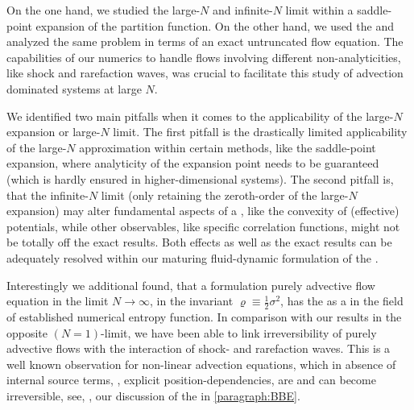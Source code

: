 On the one hand, we studied the large-$N$ and infinite-$N$ limit within a saddle-point expansion of the partition function.
On the other hand, we used the \frg{} and analyzed the same problem in terms of an exact untruncated \frg{} flow equation.
The capabilities of our \kt{} \fv{} numerics to handle \frg{} flows involving different non-analyticities, like shock and rarefaction waves, was crucial to facilitate this study of advection dominated systems at large $N$.
	
We identified two main pitfalls when it comes to the applicability of the large-$N$ expansion or large-$N$ limit.	
The first pitfall is the drastically limited applicability of the large-$N$ approximation within certain methods, like the saddle-point expansion, where analyticity of the expansion point needs to be guaranteed (which is \apriori{} hardly ensured in higher-dimensional systems).
The second pitfall is, that the infinite-$N$ limit (only retaining the zeroth-order of the large-$N$ expansion) may alter fundamental aspects of a \qft{}, like the convexity of (effective) potentials, while other observables, like specific correlation functions, might not be totally off the exact results.
Both effects as well as the exact results can be adequately resolved within our maturing fluid-dynamic formulation of the \frg{}.

Interestingly we additional found, that a formulation purely advective flow equation in the limit $N\rightarrow\infty$, in the invariant $\varrho\equiv\tfrac{1}{2}\sigma^2$, has the \tv{} as a \dash{} in the field of \cfd{} established \dash{} numerical entropy function.
In comparison with our results in the opposite $(N=1)$-limit, we have been able to link irreversibility of purely advective \frg{} flows with the interaction of shock- and rarefaction waves.
This is a well known observation for non-linear advection equations, which in absence of internal source terms, \ie{}, explicit position-dependencies, are \tvni{} and can become irreversible, see, \eg{}, our discussion of the \bbeq{} in \cref{paragraph:BBE}.

